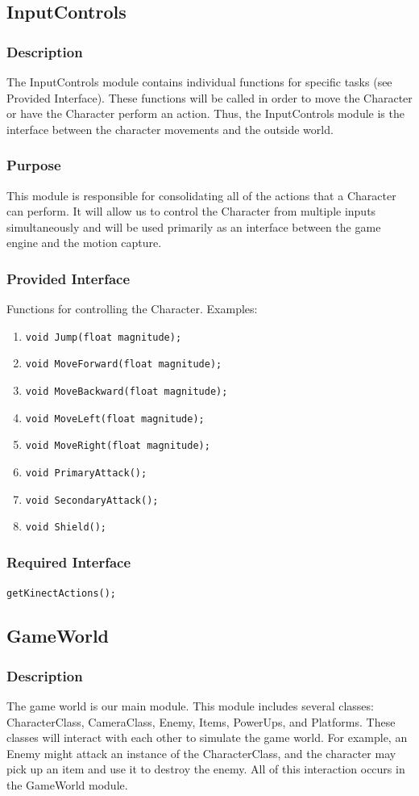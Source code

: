 \documentclass[10pt,letterpaper,oneside,english]{article}
\newcommand{\code}[1]{\texttt{#1}}
\newcommand{\citem}[1]{\item \code{#1}}
\begin{document}
\subsection{InputControls}
\subsubsection{Description}
	The InputControls module contains individual functions for specific tasks (see Provided Interface). These functions will be called in order to move the Character or have the Character perform an action. Thus, the InputControls module is the interface between the character movements and the outside world.
\subsubsection{Purpose}
	This module is responsible for consolidating all of the actions that a Character can perform. It will allow us to control the Character from multiple inputs simultaneously and will be used primarily as an interface between the game engine and the motion capture.
\subsubsection{Provided Interface}
Functions for controlling the Character. Examples:
\begin{enumerate}
		\citem {void Jump(float magnitude);}
		\citem {void MoveForward(float magnitude);}
		\citem {void MoveBackward(float magnitude);}
		\citem {void MoveLeft(float magnitude);}
		\citem {void MoveRight(float magnitude);}
		\citem {void PrimaryAttack();}
		\citem {void SecondaryAttack();}
		\citem {void Shield();}

	\end{enumerate}
\subsubsection{Required Interface}
\texttt{getKinectActions();}

\subsection{GameWorld}

\subsubsection{Description}
The game world is our main module. This module includes several classes: CharacterClass, CameraClass, Enemy, Items, PowerUps, and Platforms. These classes will interact with each other to simulate the game world. For example, an Enemy might attack an instance of the CharacterClass, and the character may pick up an item and use it to destroy the enemy. All of this interaction occurs in the GameWorld module.
\end{document}
